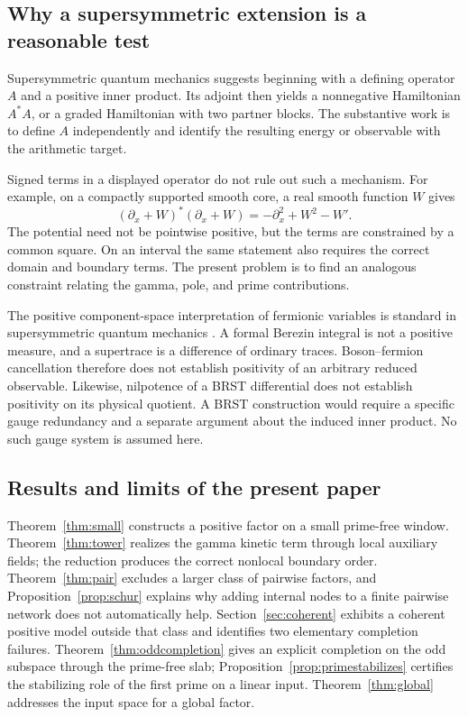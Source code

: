 \documentclass[11pt]{article}
\numberwithin{equation}{section}
\theoremstyle{definition}
\theoremstyle{remark}
\begin{document}
\subsection{Why a supersymmetric extension is a reasonable test}

Supersymmetric quantum mechanics suggests beginning with a defining operator
$A$ and a positive inner product. Its adjoint then yields a nonnegative
Hamiltonian $A^*A$, or a graded Hamiltonian with two partner blocks. The
substantive work is to define $A$ independently and identify the resulting
energy or observable with the arithmetic target.

Signed terms in a displayed operator do not rule out such a mechanism.
For example, on a compactly supported smooth core, a real smooth function
$W$ gives
\begin{equation}
(\partial_x+W)^*(\partial_x+W)
=-\partial_x^2+W^2-W'.
\end{equation}
The potential need not be pointwise positive, but the terms are constrained
by a common square. On an interval the same statement also requires the
correct domain and boundary terms. The present problem is to find an
analogous constraint relating the gamma, pole, and prime contributions.

The positive component-space interpretation of fermionic variables is
standard in supersymmetric quantum mechanics \cite{Singleton}. A formal
Berezin integral is not a positive measure, and a supertrace is a difference
of ordinary traces. Boson--fermion cancellation therefore does not establish
positivity of an arbitrary reduced observable. Likewise, nilpotence of a
BRST differential does not establish positivity on its physical quotient.
A BRST construction would require a specific gauge redundancy and a
separate argument about the induced inner product. No such gauge system is
assumed here.

\subsection{Results and limits of the present paper}

Theorem~\ref{thm:small} constructs a positive factor on a small prime-free
window. Theorem~\ref{thm:tower} realizes the gamma kinetic term through local
auxiliary fields; the reduction produces the correct nonlocal boundary
order. Theorem~\ref{thm:pair} excludes a larger class of pairwise factors,
and Proposition~\ref{prop:schur} explains why adding internal nodes to a
finite pairwise network does not automatically help.
Section~\ref{sec:coherent} exhibits a coherent positive model outside that
class and identifies two elementary completion failures.
Theorem~\ref{thm:oddcompletion} gives an explicit completion on the odd
subspace through the prime-free slab; Proposition~\ref{prop:primestabilizes}
certifies the stabilizing role of the first prime on a linear input.
Theorem~\ref{thm:global} addresses the input space for a global factor.
\end{document}
